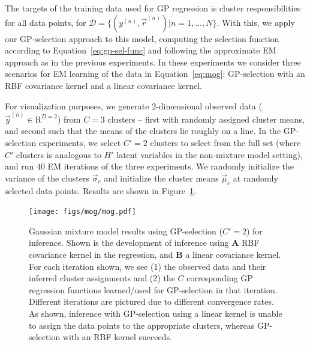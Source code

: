 The targets of the training data used for GP regression is cluster responsibilities for all data points, for $\mathcal{D} = \{ (y^{(n)}, \vec{r}^{(n)}) | n = 1, \dots, N \}$.
With this, we apply our GP-selection approach to this model, computing the selection function according to Equation~\eqref{eq:gp-sel-func} and following the approximate EM approach as in the previous experiments.
%
In these experiments we consider three scenarios for EM learning of the data in Equation~\eqref{eq:mog}: GP-selection with an RBF covariance kernel and a linear covariance kernel.%
%

For visualization purposes, we generate $2$-dimensional observed data ($\vec{y}^{(n)} \in \mathrm{R}^{D=2} $) from $C=3$ clusters -- first with randomly assigned cluster means, and second such that the means of the clusters lie roughly on a line.
In the GP-selection experiments, we select $C' = 2$ clusters to select from the full set (where $C'$ clusters is analogous to $H'$ latent variables in the non-mixture model setting),
and run $40$ EM iterations of the three experiments.
We randomly initialize the variance of the clusters $\vec{\sigma}_c$ and initialize the cluster means $\vec{\mu}_c$ at randomly selected data points.
Results are shown in Figure~\ref{fig:mog}.

\begin{figure}[t]
\begin{center}
\texttt{[image: figs/mog/mog.pdf]}
\caption{Gaussian mixture model results using GP-selection ($C'=2$) for inference.
Shown is the development of inference using \textbf{A} RBF covariance kernel in the regression, and \textbf{B} a linear covariance kernel.
For each iteration shown, we see (1) the observed data and their inferred cluster assignments and (2) the $C$ corresponding GP regression functions learned/used for GP-selection in that iteration. Different iterations are pictured due to different convergence rates. As shown, inference with GP-selection using a linear kernel is unable to assign the data points to the appropriate clusters, whereas GP-selection with an RBF kernel succeeds.}\label{fig:mog}%
\end{center}
\end{figure}


